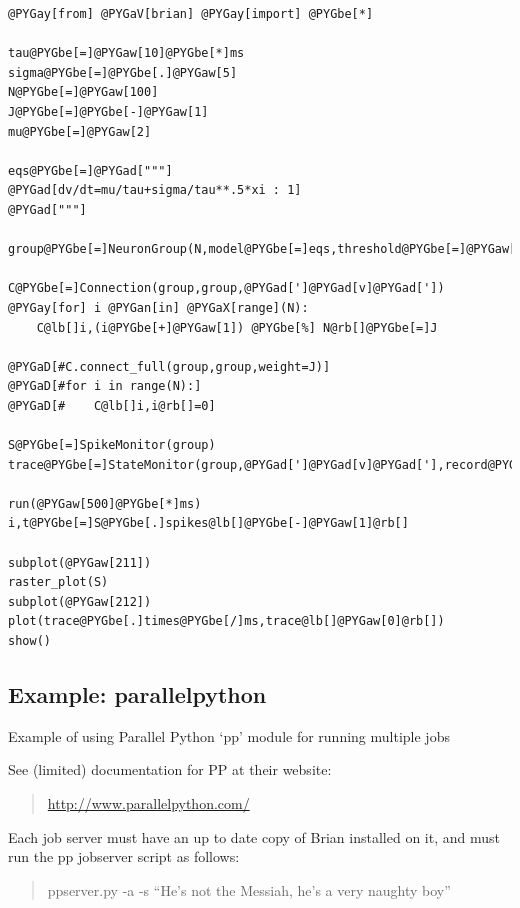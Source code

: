 \documentclass[letterpaper,10pt]{manual}
\begin{document}
\begin{Verbatim}[commandchars=@\[\]]
@PYGay[from] @PYGaV[brian] @PYGay[import] @PYGbe[*]

tau@PYGbe[=]@PYGaw[10]@PYGbe[*]ms
sigma@PYGbe[=]@PYGbe[.]@PYGaw[5]
N@PYGbe[=]@PYGaw[100]
J@PYGbe[=]@PYGbe[-]@PYGaw[1]
mu@PYGbe[=]@PYGaw[2]

eqs@PYGbe[=]@PYGad["""]
@PYGad[dv/dt=mu/tau+sigma/tau**.5*xi : 1]
@PYGad["""]

group@PYGbe[=]NeuronGroup(N,model@PYGbe[=]eqs,threshold@PYGbe[=]@PYGaw[1],reset@PYGbe[=]@PYGaw[0])

C@PYGbe[=]Connection(group,group,@PYGad[']@PYGad[v]@PYGad['])
@PYGay[for] i @PYGan[in] @PYGaX[range](N):
    C@lb[]i,(i@PYGbe[+]@PYGaw[1]) @PYGbe[%] N@rb[]@PYGbe[=]J

@PYGaD[#C.connect_full(group,group,weight=J)]
@PYGaD[#for i in range(N):]
@PYGaD[#    C@lb[]i,i@rb[]=0]

S@PYGbe[=]SpikeMonitor(group)
trace@PYGbe[=]StateMonitor(group,@PYGad[']@PYGad[v]@PYGad['],record@PYGbe[=]@PYGaA[True])

run(@PYGaw[500]@PYGbe[*]ms)
i,t@PYGbe[=]S@PYGbe[.]spikes@lb[]@PYGbe[-]@PYGaw[1]@rb[]

subplot(@PYGaw[211])
raster_plot(S)
subplot(@PYGaw[212])
plot(trace@PYGbe[.]times@PYGbe[/]ms,trace@lb[]@PYGaw[0]@rb[])
show()
\end{Verbatim}

\resetcurrentobjects
{}

\hypertarget{index-42}{}\subsection{Example: parallelpython}

Example of using Parallel Python `pp' module for running multiple jobs

See (limited) documentation for PP at their website:
\begin{quote}

\href{http://www.parallelpython.com/}{http://www.parallelpython.com/}
\end{quote}

Each job server must have an up to date copy of Brian installed on it, and
must run the pp jobserver script as follows:
\begin{quote}

ppserver.py -a -s ``He's not the Messiah, he's a very naughty boy''
\end{quote}
\end{document}
